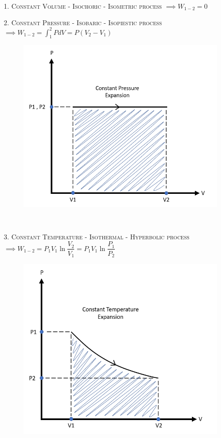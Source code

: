 \documentclass[8pt]{article}
\begin{document}
	\begin{itemize}
		\item[1.] \textsc{Constant Volume - Isochoric - Isometric process} $\implies \boxed{W_{1-2} = 0}$
		\item[2.] \textsc{Constant Pressure - Isobaric - Isopiestic process} $\implies \boxed{W_{1-2}=\int _1^2 PdV = P(V_2-V_1)}$
			\begin{figure}[H]
				\includegraphics[scale=0.3]{constpress.png} 
				\centering
			\end{figure}\hrulefill\\
		\item[3.] \textsc{Constant Temperature - Isothermal - Hyperbolic process} $\implies \boxed{W_{1-2} = P_1V_1\ln \dfrac{V_2}{V_1} = P_1V_1\ln \dfrac{P_1}{P_2}}$
			\begin{figure}[H]
				\includegraphics[scale=0.3]{consttemp.png} 

\end{figure}
\end{itemize}
\end{document}
